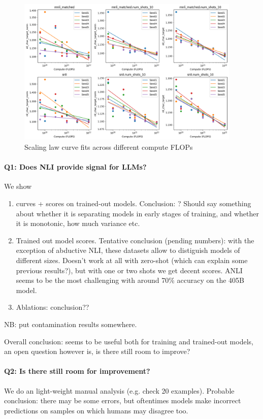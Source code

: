 \begin{figure}[ht]
    \centering
    \includegraphics[width=0.95\textwidth]{nli_plots/sl_fits_mnli_snli.png}
    \caption{Scaling law curve fits across different compute FLOPs}
    \label{fig:sl_mnli_snli}
\end{figure}

\paragraph{Q1: Does NLI provide signal for LLMs?}
We show \begin{enumerate}
    \item curves + scores on trained-out models.  Conclusion: ? Should say something about whether it is separating models in early stages of training, and whether it is monotonic, how much variance etc.
    \item Trained out model scores. Tentative conclusion (pending numbers): with the exception of abductive NLI, these datasets allow to distiguish models of different sizes. Doesn't work at all with zero-shot (which can explain some previous results?), but with one or two shots we get decent scores. ANLI seems to be the most challenging with around 70\% accuracy on the 405B model.
    \item Ablations: conclusion??
\end{enumerate}

NB: put contamination results somewhere.

Overall conclusion: seems to be useful both for training and trained-out models, an open question however is, is there still room to improve?

\paragraph{Q2: Is there still room for improvement?}
We do an light-weight manual analysis (e.g. check 20 examples).
Probable conclusion: there may be some errors, but oftentimes models make incorrect predictions on samples on which humans may disagree too.

